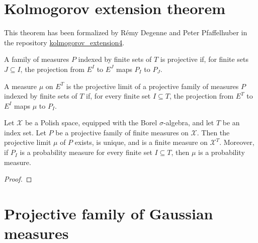 \section{Kolmogorov extension theorem}

This theorem has been formalized by Rémy Degenne and Peter Pfaffelhuber in the repository \href{https://github.com/RemyDegenne/kolmogorov_extension4}{kolmogorov\_extension4}.

\begin{definition}\label{def:IsProjectiveMeasureFamily}
  \mathlibok
A family of measures $P$ indexed by finite sets of $T$ is projective if, for finite sets $J \subseteq I$, the projection from $E^I$ to $E^J$ maps $P_I$ to $P_J$.
\end{definition}


\begin{definition}\label{def:IsProjectiveLimit}
  \mathlibok
A measure $\mu$ on $E^T$ is the projective limit of a projective family of measures $P$ indexed by finite sets of $T$ if, for every finite set $I \subseteq T$, the projection from $E^T$ to $E^I$ maps $\mu$ to $P_I$.
\end{definition}


\begin{theorem}\label{thm:kolmogorovExtension}
  \leanok
Let $\mathcal{X}$ be a Polish space, equipped with the Borel $\sigma$-algebra, and let $T$ be an index set.
Let $P$ be a projective family of finite measures on $\mathcal{X}$.
Then the projective limit $\mu$ of $P$ exists, is unique, and is a finite measure on $\mathcal{X}^T$.
Moreover, if $P_I$ is a probability measure for every finite set $I \subseteq T$, then $\mu$ is a probability measure.
\end{theorem}

\begin{proof}\leanok

\end{proof}


\section{Projective family of Gaussian measures}


